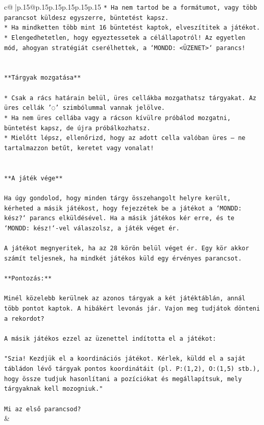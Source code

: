 \documentclass{article}
\begin{document}
{\begin{supertabular}{c@{$\;$}|p{.15\linewidth}@{}p{.15\linewidth}p{.15\linewidth}p{.15\linewidth}p{.15\linewidth}p{.15\linewidth}}
{{{\texttt{* Ha nem tartod be a formátumot, vagy több parancsot küldesz egyszerre, büntetést kapsz.} \\
\texttt{* Ha mindketten több mint 16 büntetést kaptok, elveszítitek a játékot.} \\
\texttt{* Elengedhetetlen, hogy egyeztessetek a célállapotról! Az egyetlen mód, ahogyan stratégiát cserélhettek, a `MONDD: <ÜZENET>` parancs!} \\
\\ 
\\ 
\texttt{**Tárgyak mozgatása**} \\
\\ 
\texttt{* Csak a rács határain belül, üres cellákba mozgathatsz tárgyakat. Az üres cellák '◌' szimbólummal vannak jelölve.} \\
\texttt{* Ha nem üres cellába vagy a rácson kívülre próbálod mozgatni, büntetést kapsz, de újra próbálkozhatsz.} \\
\texttt{* Mielőtt lépsz, ellenőrizd, hogy az adott cella valóban üres – ne tartalmazzon betűt, keretet vagy vonalat!} \\
\\ 
\\ 
\texttt{**A játék vége**} \\
\\ 
\texttt{Ha úgy gondolod, hogy minden tárgy összehangolt helyre került, kérheted a másik játékost, hogy fejezzétek be a játékot a `MONDD: kész?` parancs elküldésével. Ha a másik játékos kér erre, és te `MONDD: kész!`{-}vel válaszolsz, a játék véget ér.} \\
\\ 
\texttt{A játékot megnyeritek, ha az 28 körön belül véget ér. Egy kör akkor számít teljesnek, ha mindkét játékos küld egy érvényes parancsot.} \\
\\ 
\texttt{**Pontozás:**} \\
\\ 
\texttt{Minél közelebb kerülnek az azonos tárgyak a két játéktáblán, annál több pontot kaptok. A hibákért levonás jár. Vajon meg tudjátok dönteni a rekordot?} \\
\\ 
\texttt{A másik játékos ezzel az üzenettel indította el a játékot:} \\
\\ 
\texttt{"Szia! Kezdjük el a koordinációs játékot. Kérlek, küldd el a saját tábládon lévő tárgyak pontos koordinátáit (pl. P:(1,2), O:(1,5) stb.), hogy össze tudjuk hasonlítani a pozíciókat és megállapítsuk, mely tárgyaknak kell mozogniuk."} \\
\\ 
\texttt{Mi az első parancsod?} \\
            }
        }
    }
    & \\ \\


\end{supertabular}}
\end{document}

